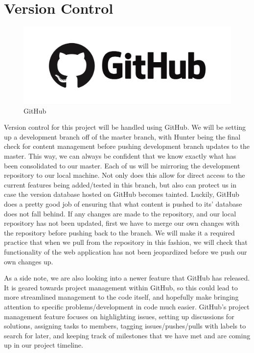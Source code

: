 \documentclass[12pt,a4paper]{report}
\begin{document}
	\section{Version Control}
	\begin{figure}[H]
		\centering
		\includegraphics[scale=.3]{github}
		\caption{GitHub}
		\label{fig: GitHub}
	\end{figure}
	Version control for this project will be handled using GitHub. We will be setting up a development branch off of the master branch, with Hunter being the final check for content management before pushing development branch updates to the master. This way, we can always be confident that we know exactly what has been consolidated to our master. Each of us will be mirroring the development repository to our local machine. Not only does this allow for direct access to the current features being added/tested in this branch, but also can protect us in case the version database hosted on GitHub becomes tainted. Luckily, GitHub does a pretty good job of ensuring that what content is pushed to its' database does not fall behind. If any changes are made to the repository, and our local repository has not been updated, first we have to merge our own changes with the repository before pushing back to the branch. We will make it a required practice that when we pull from the repository in this fashion, we will check that functionality of the web application has not been jeopardized before we push our own changes up. \par
	As a side note, we are also looking into a newer feature that GitHub has released. It is geared towards project management within GitHub, so this could lead to more streamlined management to the code itself, and hopefully make bringing attention to specific problems/development in code much easier. GitHub's project management feature focuses on highlighting issues, setting up discussions for solutions, assigning tasks to members, tagging issues/pushes/pulls with labels to search for later, and keeping track of milestones that we have met and are coming up in our project timeline.
\end{document}
